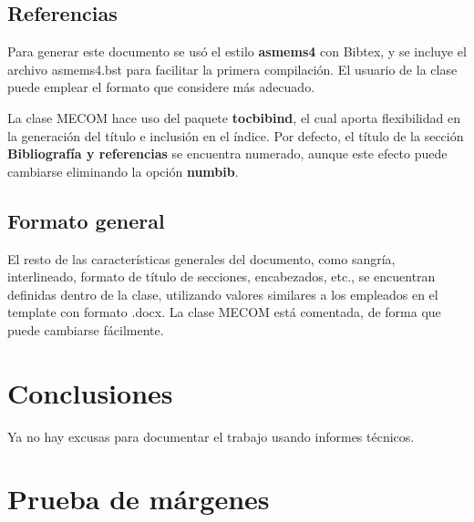 \documentclass[a4paper,11pt,twoside]{MECOM}
\begin{document}
    
    \subsection{Referencias}
    Para generar este documento se us\'o el estilo {\bf asmems4} con Bibtex, y se incluye el archivo asmems4.bst para facilitar la primera compilaci\'on. El usuario de la clase puede emplear el formato que considere m\'as adecuado.
    \par
    La clase MECOM hace uso del paquete {\bf tocbibind}, el cual aporta flexibilidad en la generaci\'on del t\'itulo e inclusi\'on en el \'indice. Por defecto, el t\'itulo de la secci\'on {\bf Bibliograf\'ia y referencias} se encuentra numerado, aunque este efecto puede cambiarse eliminando la opci\'on {\bf numbib}.
    
    \subsection{Formato general}
    El resto de las caracter\'isticas generales del documento, como sangr\'ia, interlineado, formato de t\'itulo de secciones, encabezados, etc., se encuentran definidas dentro de la clase, utilizando valores similares a los empleados en el template con formato .docx. La clase MECOM est\'a comentada, de forma que puede cambiarse f\'acilmente.
    
    
    \section{Conclusiones}
    Ya no hay excusas para documentar el trabajo usando informes t\'ecnicos.\\    
    
    
    
    
    
    
    \newpage
    \section{Prueba de m\'argenes} \blindtext[11]    
    
\end{document}
